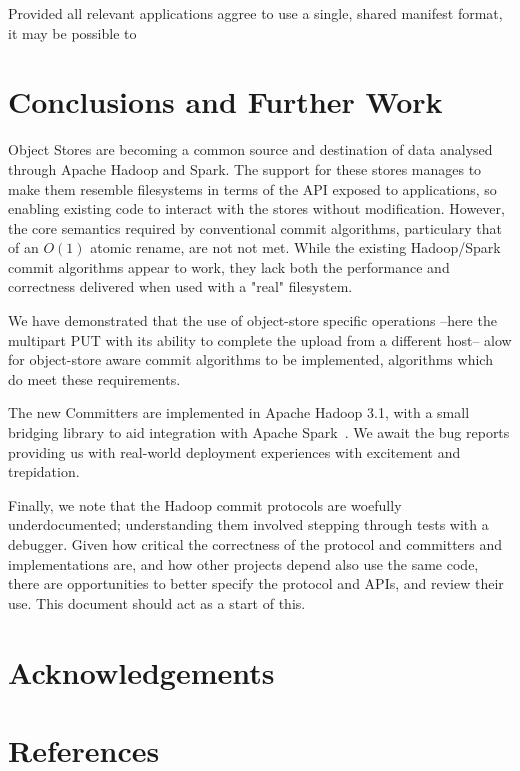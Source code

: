 \documentclass[9pt,technote]{IEEEtran}
\begin{document}
Provided all relevant applications aggree to use a single, shared manifest
format, it may be possible to

\section{Conclusions and Further Work}
\label{sec:conclusions}

Object Stores are becoming a common source and destination of data analysed
through Apache Hadoop and Spark.
The support for these stores manages to make them resemble filesystems in
terms of the API exposed to applications, so enabling existing code to
interact with the stores without modification.
However, the core semantics required by conventional commit algorithms, particulary
that of an $O(1)$ atomic rename, are not not met.
While the existing Hadoop/Spark commit algorithms appear to work, they lack
both the performance and correctness delivered when used with a "real" filesystem.

We have demonstrated that the use of object-store specific operations --here
the multipart PUT with its ability to complete the upload from a different host--
alow for object-store aware commit algorithms to be implemented,
algorithms which do meet these requirements.

The new Committers are implemented in Apache Hadoop 3.1, with a small bridging
library to aid integration with Apache Spark\ \cite{cloud-integration-module}.
We await the bug reports providing us with real-world deployment experiences
with excitement and trepidation.


Finally, we note that the Hadoop commit protocols are woefully underdocumented;
understanding them involved stepping through tests with a debugger.
Given how critical the correctness of the protocol and committers and implementations
are, and how other projects depend also use the same code, there
are opportunities to better specify the protocol and APIs, and review
their use.
This document should act as a start of this.


\section{Acknowledgements}
\label{sec:acknowledgements}


\section{References}
\label{sec:references}



\end{document}
